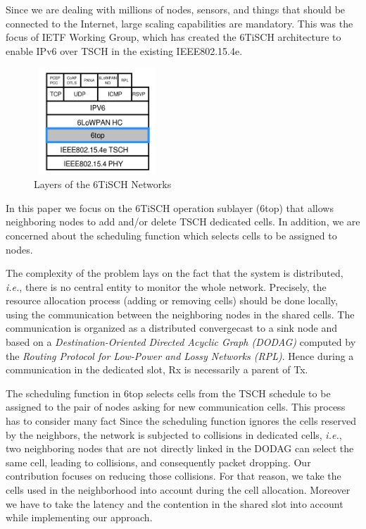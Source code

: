\documentclass[10pt, conference, compsocconf]{IEEEtran}
\begin{document}
Since we are dealing with millions of nodes, sensors, and things that should be connected to the Internet, large scaling capabilities are mandatory. This was the focus of IETF Working Group, which has created the 6TiSCH architecture to enable IPv6 over TSCH in the existing IEEE802.15.4e.
\begin{figure}[h]
    \centering
    \includegraphics[width=4.77cm, height=4cm]{layers.png}
    \caption{Layers of the 6TiSCH Networks}
    \label{fig:Layers of the 6TiSCH Networks}
\end{figure}

In this paper we focus on the 6TiSCH operation sublayer (6top) that  allows neighboring nodes to add and/or delete TSCH dedicated cells. In addition, we are concerned about the scheduling function which selects cells to be assigned to nodes.

 The complexity of the problem lays on the fact that the system is distributed, {\em i.e.}, there is no central entity to monitor the whole network. Precisely, the resource allocation process (adding or removing cells) should be done locally, using the communication between the neighboring nodes in the shared cells. The communication is organized as a distributed convergecast to a sink node and based on a {\em Destination-Oriented Directed Acyclic Graph (DODAG)} computed by the  {\em Routing Protocol for Low-Power and Lossy Networks (RPL)}. Hence during a communication in the dedicated slot, Rx is necessarily a parent of Tx.  

The scheduling function in 6top selects cells from the TSCH schedule to be assigned to the pair of nodes asking for new communication cells. This process has to consider many fact
Since the scheduling function ignores the cells reserved by the neighbors, the network is subjected to collisions in dedicated cells, {\em i.e.}, two neighboring nodes that are not directly linked in the DODAG can select the same cell, leading to collisions, and consequently packet dropping. Our contribution focuses on reducing those collisions. For that reason, we take the cells used in the neighborhood into account during the cell allocation. Moreover we have to take the latency and the contention in the shared slot into account while implementing our approach.
\end{document}
